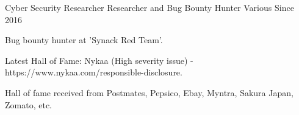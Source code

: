 \begin{cventries}
  \cventry
    {Cyber Security Researcher} %
    {Researcher and Bug Bounty Hunter} %
    {Various} %
    {Since 2016} %
    {
      \begin{cvitems} %
        \item {Bug bounty hunter at 'Synack Red Team'.}
        \item {Latest Hall of Fame: Nykaa (High severity issue) - https://www.nykaa.com/responsible-disclosure.}
        \item {Hall of fame received from Postmates, Pepsico, Ebay, Myntra, Sakura Japan, Zomato, etc.}
      \end{cvitems}
    }

\end{cventries}
